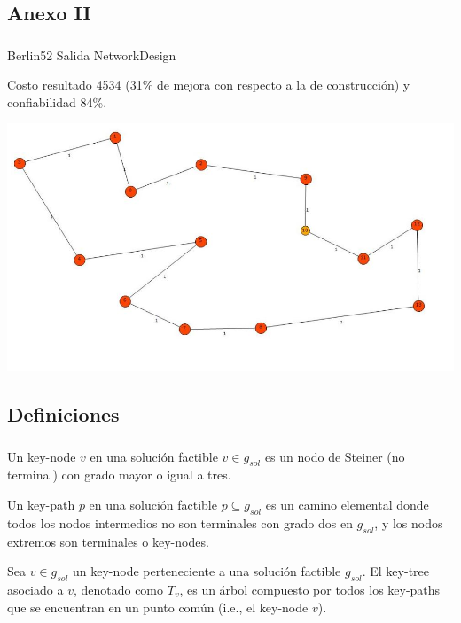 \subsection{Anexo II}
\begin{frame}\frametitle{}
\begin{block}{Berlin52 Salida NetworkDesign}
\begin{scriptsize}
Costo resultado 4534 (31\% de mejora con respecto a la de construcción) y confiabilidad 84\%.
\end{scriptsize}
\begin{center}
   \includegraphics[scale=0.35]{figuras/4}
\end{center}
\end{block}
\end{frame}

\subsection{Definiciones}
\begin{frame}\frametitle{}
\begin{definition}
Un key-node $v$ en una solución factible $v \in g_{sol}$ es un nodo de Steiner (no terminal) con grado mayor o igual a tres.
\end{definition}
\begin{definition}
Un key-path $p$ en una solución factible $p \subseteq g_{sol}$ es un camino elemental 
donde todos los nodos intermedios no son terminales con grado dos en $g_{sol}$, 
y los nodos extremos son terminales o key-nodes.
\end{definition}
\begin{definition}
Sea $v \in g_{sol}$ un key-node perteneciente a una solución factible $g_{sol}$. 
El key-tree asociado a $v$, denotado como $T_v$, es un árbol compuesto por todos los 
key-paths que se encuentran en un punto común (i.e., el key-node $v$).
\end{definition}
\end{frame}

